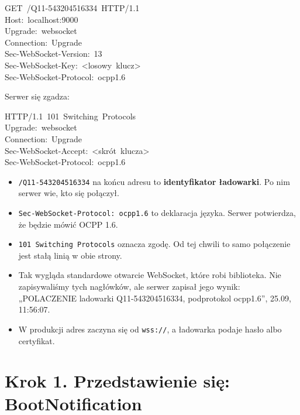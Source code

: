 \documentclass[11pt,a4paper]{article}
\begin{document}
\begin{kodbox}
\mbox{}GET\ /Q11-543204516334\ HTTP/1.1\\
\mbox{}Host:\ localhost:9000\\
\mbox{}Upgrade:\ websocket\\
\mbox{}Connection:\ Upgrade\\
\mbox{}Sec-WebSocket-Version:\ 13\\
\mbox{}Sec-WebSocket-Key:\ <losowy\ klucz>\\
\mbox{}Sec-WebSocket-Protocol:\ ocpp1.6
\end{kodbox}

Serwer się zgadza:


\begin{kodbox}
\mbox{}HTTP/1.1\ 101\ Switching\ Protocols\\
\mbox{}Upgrade:\ websocket\\
\mbox{}Connection:\ Upgrade\\
\mbox{}Sec-WebSocket-Accept:\ <skrót\ klucza>\\
\mbox{}Sec-WebSocket-Protocol:\ ocpp1.6
\end{kodbox}

\begin{itemize}
\item \texttt{/\allowbreak{}Q11-\allowbreak{}543204516334} na końcu adresu to \textbf{identyfikator ładowarki}. Po nim serwer wie, kto się połączył.
\item \texttt{Sec-\allowbreak{}WebSocket-\allowbreak{}Protocol:\allowbreak{} ocpp1.\allowbreak{}6} to deklaracja języka. Serwer potwierdza, że będzie mówić OCPP 1.6.
\item \texttt{101 Switching Protocols} oznacza zgodę. Od tej chwili to samo połączenie jest stałą linią w obie strony.
\item Tak wygląda standardowe otwarcie WebSocket, które robi biblioteka. Nie zapisywaliśmy tych nagłówków, ale serwer zapisał jego wynik: „POLACZENIE ladowarki Q11-543204516334, podprotokol ocpp1.6”,  25.09, 11:56:07.
\item W produkcji adres zaczyna się od \texttt{wss://}, a ładowarka podaje hasło albo certyfikat.
\end{itemize}

\section*{Krok 1. Przedstawienie się: BootNotification}
\end{document}
